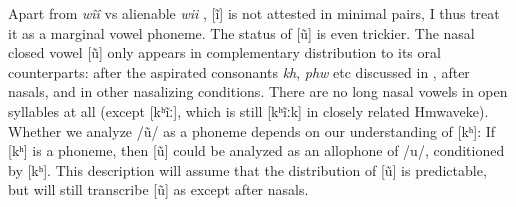 	
	\begin{table}
		\caption{Minimal pairs for vowels}
	\label{tab:phon}
	\end{table}

	
Apart from \textit{wîî}  vs alienable \textit{wii} , [ĩ] is not attested in minimal pairs, I thus treat it as a marginal vowel phoneme. The status of [ũ] is even trickier. 
The nasal closed vowel [ũ] only appears in complementary distribution to its oral counterparts: after the aspirated consonants \textit{kh}, \textit{phw} etc discussed in , after nasals, and in other nasalizing conditions. There are no long nasal vowels in open syllables at all (except [kʰĩː], which is still [kʰĩːk] in closely related Hmwaveke).
	Whether we analyze %
	/ũ/ as a phoneme depends on our understanding of [kʰ]: 
	If [kʰ] is a phoneme, then %
	[ũ] could be analyzed as an allophone of %
	/u/, conditioned by [kʰ]. %
This description will assume that the distribution of [ũ] is predictable, but will still transcribe [ũ] as  except after nasals.
	
